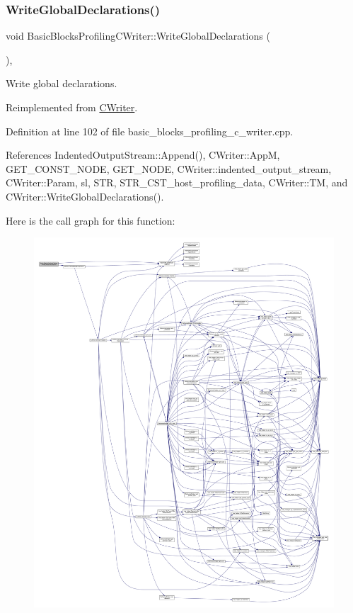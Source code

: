 \subsubsection{\texorpdfstring{Write\+Global\+Declarations()}{WriteGlobalDeclarations()}}
{\footnotesize\ttfamily void Basic\+Blocks\+Profiling\+C\+Writer\+::\+Write\+Global\+Declarations (\begin{DoxyParamCaption}{ }\end{DoxyParamCaption})\hspace{0.3cm}{\ttfamily [override]}, {\ttfamily [virtual]}}



Write global declarations. 



Reimplemented from \hyperlink{classCWriter_a42b2b558bd1efb2dc637664f5df4df28}{C\+Writer}.



Definition at line 102 of file basic\+\_\+blocks\+\_\+profiling\+\_\+c\+\_\+writer.\+cpp.



References Indented\+Output\+Stream\+::\+Append(), C\+Writer\+::\+AppM, G\+E\+T\+\_\+\+C\+O\+N\+S\+T\+\_\+\+N\+O\+DE, G\+E\+T\+\_\+\+N\+O\+DE, C\+Writer\+::indented\+\_\+output\+\_\+stream, C\+Writer\+::\+Param, sl, S\+TR, S\+T\+R\+\_\+\+C\+S\+T\+\_\+host\+\_\+profiling\+\_\+data, C\+Writer\+::\+TM, and C\+Writer\+::\+Write\+Global\+Declarations().

Here is the call graph for this function\+:
\nopagebreak
\begin{figure}[H]
\begin{center}
\leavevmode
\includegraphics[width=350pt]{d1/d9c/classBasicBlocksProfilingCWriter_a96cb6c4a5df56ae5f5b5e65c73e6796d_cgraph}
\end{center}
\end{figure}


